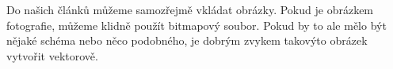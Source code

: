 \documentclass[a4paper, 11pt]{article}
\begin{document}
	Do našich článků můžeme samozřejmě vkládat obrázky. Pokud je obrázkem fotografie, můžeme klidně použít bitmapový soubor. Pokud by to ale mělo být nějaké schéma nebo něco podobného, je dobrým zvykem takovýto obrázek vytvořit vektorově.  
	
	\begin{figure}[h]
	\centering
\end{figure}
\end{document}

